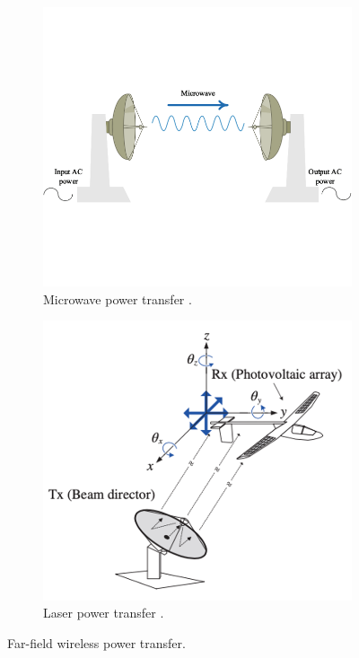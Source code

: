 \begin{figure}[htbp]
    \begin{subfigure}{0.5\textwidth}
        \centering
        \includegraphics[width=0.9\linewidth]{images/1_microwave_power_transfer.png}
        \caption{Microwave power transfer \cite{Orekan}.}
        \label{fig:subim1}
    \end{subfigure}
    \begin{subfigure}{0.5\textwidth}
        \centering
        \includegraphics[width=0.9\linewidth]{images/1_laser_power_transfer.png}
        \caption{Laser power transfer \cite{Chun}.}
        \label{fig:subim2}
    \end{subfigure}

    \caption{Far-field wireless power transfer.}
    \label{fig:image2}
\end{figure}

